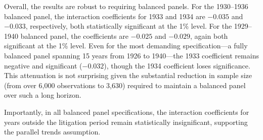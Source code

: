 Overall, the results are robust to requiring balanced panels. For the 1930--1936 balanced panel, the interaction coefficients for 1933 and 1934 are $-0.035$ and $-0.033$, respectively, both statistically significant at the 1\% level. For the 1929--1940 balanced panel, the coefficients are $-0.025$ and $-0.029$, again both significant at the 1\% level. Even for the most demanding specification---a fully balanced panel spanning 15 years from 1926 to 1940---the 1933 coefficient remains negative and significant ($-0.032$), though the 1934 coefficient loses significance. This attenuation is not surprising given the substantial reduction in sample size (from over 6,000 observations to 3,630) required to maintain a balanced panel over such a long horizon.

Importantly, in all balanced panel specifications, the interaction coefficients for years outside the litigation period remain statistically insignificant, supporting the parallel trends assumption.
